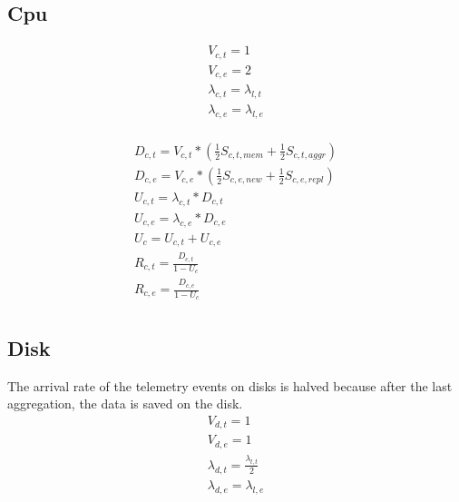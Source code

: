 \documentclass[11pt]{article}
\begin{document}
\subsection{Cpu}

\begin{equation}
    \begin{array}{l}
        V_{c, t} = 1 \\
        V_{c, e} = 2 \\ %
        \lambda_{c, t} = \lambda_{l, t} \\
        \lambda_{c, e} = \lambda_{l, e} \\
    \end{array}
\end{equation}

\begin{equation}
    \begin{array}{l}
        D_{c, t} = V_{c, t} * (\frac{1}{2}S_{c, t, mem} + \frac{1}{2}S_{c, t, aggr}) \\ %
        D_{c, e} = V_{c, e} * (\frac{1}{2}S_{c, e, new} + \frac{1}{2}S_{c, e, repl}) \\
        U_{c, t} = \lambda_{c, t} * D_{c, t} \\
        U_{c, e} = \lambda_{c, e} * D_{c, e} \\
        U_{c} = U_{c, t} + U_{c, e} \\
        R_{c, t} = \frac{D_{c, t}}{1 - U_{c}} \\
        R_{c, e} = \frac{D_{c, e}}{1 - U_{c}} \\
    \end{array}
\end{equation}

\subsection{Disk}
The arrival rate of the telemetry events on disks is halved because after the last aggregation, the data is saved on the disk. 
\begin{equation}
    \begin{array}{l}
        V_{d, t} = 1 \\
        V_{d, e} = 1 \\ 
        \lambda_{d, t} = \frac{\lambda_{l, t}}{2} \\ %
        \lambda_{d, e} = \lambda_{l, e} \\
    \end{array}
\end{equation}
\end{document}
